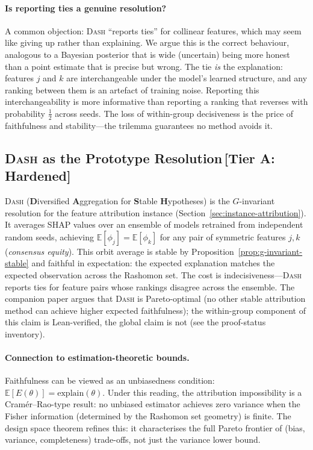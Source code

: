 \documentclass[11pt,a4paper]{article}
\newcommand{\E}{\mathbb{E}}
\newcommand{\DASH}{\textsc{Dash}}
\begin{document}
\paragraph{Is reporting ties a genuine resolution?}
A common objection: \DASH{} ``reports ties'' for collinear features, which may seem like giving up rather than explaining. We argue this is the correct behaviour, analogous to a Bayesian posterior that is wide (uncertain) being more honest than a point estimate that is precise but wrong. The tie \emph{is} the explanation: features $j$ and $k$ are interchangeable under the model's learned structure, and any ranking between them is an artefact of training noise. Reporting this interchangeability is more informative than reporting a ranking that reverses with probability $\tfrac{1}{2}$ across seeds. The loss of within-group decisiveness is the price of faithfulness and stability---the trilemma guarantees no method avoids it.

\subsection{\DASH{} as the Prototype Resolution\,\textnormal{\normalsize[Tier A: Hardened]}}
\label{sec:dash-prototype}

\DASH{} (\textbf{D}iversified \textbf{A}ggregation for \textbf{S}table \textbf{H}ypotheses)
is the $G$-invariant resolution for the feature attribution instance
(Section~\ref{sec:instance-attribution}).  It averages SHAP values over an
ensemble of models retrained from independent random seeds, achieving
$\E[\phi_j] = \E[\phi_k]$ for any pair of symmetric features $j, k$
(\emph{consensus equity}).  This orbit average is stable by
Proposition~\ref{prop:g-invariant-stable} and faithful in expectation: the
expected explanation matches the expected observation across the Rashomon set.
The cost is indecisiveness---\DASH{} reports ties for feature pairs whose
rankings disagree across the ensemble.  The companion paper argues that
\DASH{} is Pareto-optimal (no other stable attribution method can achieve
higher expected faithfulness); the within-group component of this claim is
Lean-verified, the global claim is not (see the proof-status inventory).

\paragraph{Connection to estimation-theoretic bounds.}
Faithfulness can be viewed as an unbiasedness condition: $\E[E(\theta)] = \text{explain}(\theta)$. Under this reading, the attribution impossibility is a Cram\'er--Rao-type result: no unbiased estimator achieves zero variance when the Fisher information (determined by the Rashomon set geometry) is finite. The design space theorem refines this: it characterises the full Pareto frontier of (bias, variance, completeness) trade-offs, not just the variance lower bound.
\end{document}
